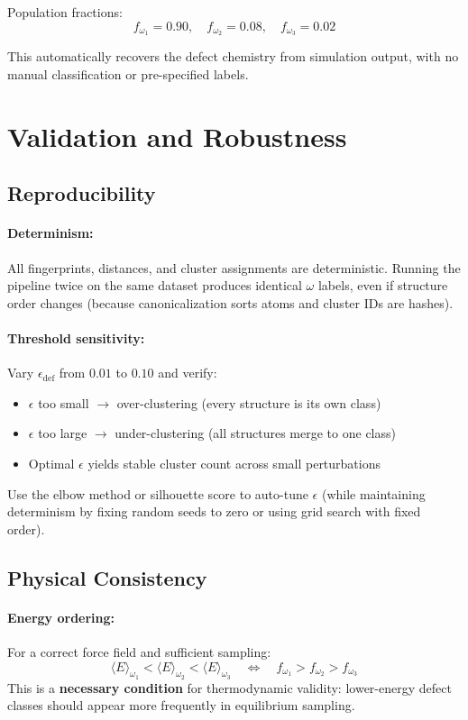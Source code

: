 \documentclass[11pt]{article}
\begin{document}
Population fractions:
\begin{equation}
f_{\omega_1} = 0.90, \quad f_{\omega_2} = 0.08, \quad f_{\omega_3} = 0.02
\end{equation}

This automatically recovers the defect chemistry from simulation output, with no
manual classification or pre-specified labels.

\section{Validation and Robustness}

\subsection{Reproducibility}

\paragraph{Determinism:}
All fingerprints, distances, and cluster assignments are deterministic. Running
the pipeline twice on the same dataset produces identical $\omega$ labels, even
if structure order changes (because canonicalization sorts atoms and cluster IDs
are hashes).

\paragraph{Threshold sensitivity:}
Vary $\epsilon_{\mathrm{def}}$ from $0.01$ to $0.10$ and verify:
\begin{itemize}
  \item $\epsilon$ too small $\to$ over-clustering (every structure is its own class)
  \item $\epsilon$ too large $\to$ under-clustering (all structures merge to one class)
  \item Optimal $\epsilon$ yields stable cluster count across small perturbations
\end{itemize}

Use the elbow method or silhouette score to auto-tune $\epsilon$ (while maintaining
determinism by fixing random seeds to zero or using grid search with fixed order).

\subsection{Physical Consistency}

\paragraph{Energy ordering:}
For a correct force field and sufficient sampling:
\begin{equation}
\langle E \rangle_{\omega_1} < \langle E \rangle_{\omega_2} < \langle E \rangle_{\omega_3}
\quad \Leftrightarrow \quad
f_{\omega_1} > f_{\omega_2} > f_{\omega_3}
\end{equation}
This is a \textbf{necessary condition} for thermodynamic validity: lower-energy
defect classes should appear more frequently in equilibrium sampling.
\end{document}
